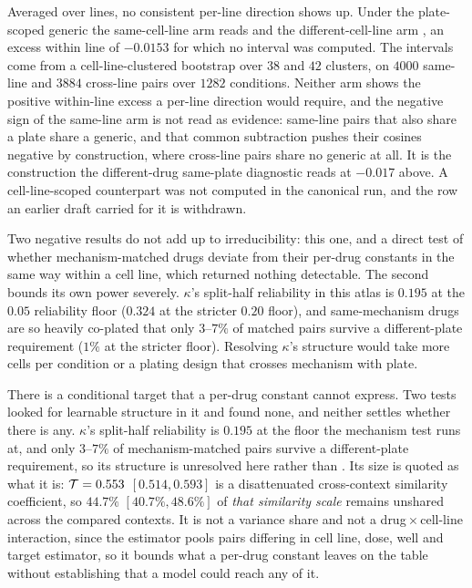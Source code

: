 Averaged over lines, no consistent per-line direction shows up. Under the
plate-scoped generic the same-cell-line arm reads 
and the different-cell-line arm , an excess within
line of $-0.0153$ for which no interval was computed. The intervals come from a
cell-line-clustered bootstrap over $\num{38}$ and $\num{42}$ clusters, on
$\num{4000}$ same-line and $\num{3884}$ cross-line pairs over $\num{1282}$
conditions. Neither arm shows the positive within-line excess a per-line
direction would require, and the negative sign of the same-line arm is not read
as evidence: same-line pairs that also share a plate share a generic, and that
common subtraction pushes their cosines negative by construction, where
cross-line pairs share no generic at all. It is the construction the
different-drug same-plate diagnostic reads at $-0.017$ above. A
cell-line-scoped counterpart was not computed in the canonical run, and the row
an earlier draft carried for it is withdrawn.

Two negative results do not add up to irreducibility: this one, and a direct
test of whether mechanism-matched drugs deviate from their per-drug constants in
the same way within a cell line, which returned nothing detectable. The second
bounds its own power severely. $\kappa$'s split-half reliability in this atlas is
$0.195$ at the $0.05$ reliability floor ($0.324$ at the stricter $0.20$ floor),
and same-mechanism drugs are so heavily co-plated that only $3$--$7\%$ of
matched pairs survive a different-plate requirement ($1\%$ at the stricter
floor). Resolving $\kappa$'s structure would take more cells per condition or a
plating design that crosses mechanism with plate.

\begin{claim}
There is a conditional target that a per-drug constant cannot express. Two tests
looked for learnable structure in it and found none, and neither settles whether
there is any. $\kappa$'s split-half reliability is $0.195$ at the floor the
mechanism test runs at, and only $3$--$7\%$ of mechanism-matched pairs survive a
different-plate requirement, so its structure is unresolved here rather than
\shownzero. Its size is quoted as what it is: $\mathcal{T} = 0.553$
\nolinebreak[3]$[0.514, 0.593]$ is a disattenuated cross-context similarity
coefficient, so $44.7\%$ $[40.7\%, 48.6\%]$ of \emph{that similarity scale}
remains unshared across the compared contexts. It is not a variance share and not
a drug\,$\times$\,cell-line interaction, since the estimator pools pairs
differing in cell line, dose, well and target estimator, so it bounds what a
per-drug constant leaves on the table without establishing that a model could
reach any of it.
\end{claim}

